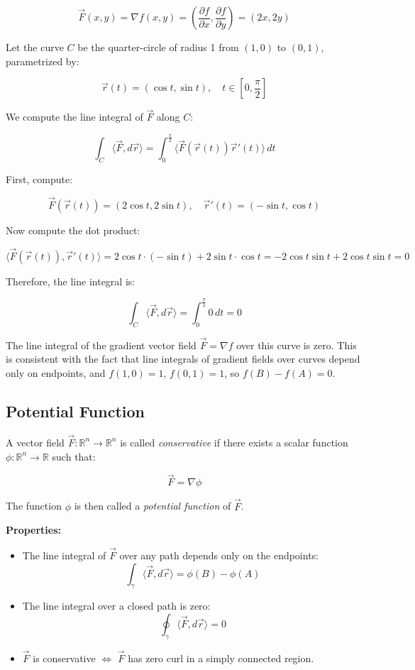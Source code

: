 \[
\vec{F}(x, y) = \nabla f(x, y) = \left( \frac{\partial f}{\partial x}, \frac{\partial f}{\partial y} \right) = (2x, 2y)
\]

Let the curve \( C \) be the quarter-circle of radius 1 from \( (1, 0) \) to \( (0, 1) \), 
parametrized by:

\[
\vec{r}(t) = (\cos t, \sin t), \quad t \in \left[0, \frac{\pi}{2}\right]
\]

We compute the line integral of \( \vec{F} \) along \( C \):

\[
\int_C \langle \vec{F}, d\vec{r}\rangle = \int_0^{\frac{\pi}{2}} \langle\vec{F}(\vec{r}(t)) \vec{r}'(t) \rangle\, dt
\]

First, compute:

\[
\vec{F}(\vec{r}(t)) = (2\cos t, 2\sin t), \quad \vec{r}'(t) = (-\sin t, \cos t)
\]

Now compute the dot product:

\[
\langle\vec{F}(\vec{r}(t)), \vec{r}'(t)\rangle = 2\cos t \cdot (-\sin t) + 2\sin t \cdot \cos t = -2\cos t \sin t + 2\cos t \sin t = 0
\]

Therefore, the line integral is:

\[
\int_C \langle \vec{F}, d\vec{r}\rangle = \int_0^{\frac{\pi}{2}} 0 \, dt = 0
\]

The line integral of the gradient vector field \( \vec{F} = \nabla f \) over this curve is zero. 
This is consistent with the fact that line integrals of gradient fields over 
curves depend only on endpoints, and 
\( f(1,0) = 1 \), \( f(0,1) = 1 \), so \( f(B) - f(A) = 0 \).


\subsection{Potential Function}

A vector field \( \vec{F} : \mathbb{R}^n \to \mathbb{R}^n \) is called \emph{conservative} if there exists a scalar function \( \phi : \mathbb{R}^n \to \mathbb{R} \) such that:

\[
\vec{F} = \nabla \phi
\]

The function \( \phi \) is then called a \emph{potential function} of \( \vec{F} \).

\textbf{Properties:}
\begin{itemize}[label=\(-\)]
    \item The line integral of \( \vec{F} \) over any path depends only on the endpoints:
    \[
    \int_\gamma \langle \vec{F}, d\vec{r} \rangle = \phi(B) - \phi(A)
    \]
    \item The line integral over a closed path is zero:
    \[
    \oint_\gamma \langle \vec{F}, d\vec{r} \rangle = 0
    \]
    \item \( \vec{F} \) is conservative \( \Leftrightarrow \) \( \vec{F} \) has zero curl in a simply connected region.
\end{itemize}


